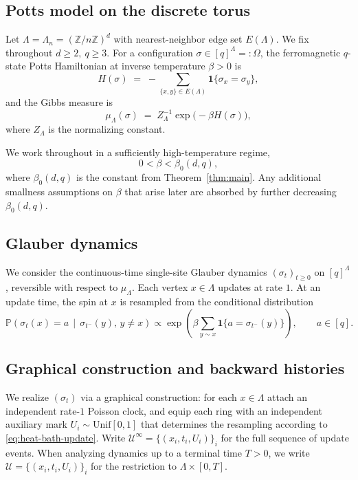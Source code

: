 \documentclass[letterpaper,11pt,reqno]{amsart}
\theoremstyle{definition}
\begin{document}
\subsection{Potts model on the discrete torus}
Let $\Lambda=\Lambda_n=(\mathbb{Z}/n\mathbb{Z})^d$ with nearest-neighbor edge set $E(\Lambda)$. We fix throughout $d\geq 2,\ q\geq 3$. For a configuration $\sigma\in[q]^\Lambda=:\Omega$, the ferromagnetic $q$-state Potts Hamiltonian at inverse temperature $\beta>0$ is
\[
H(\sigma) \;=\; - \sum_{\{x,y\}\in E(\Lambda)} \mathbf{1}\{\sigma_x=\sigma_y\},
\]
and the Gibbs measure is
\[
\mu_\Lambda(\sigma)
\;=\;
Z_\Lambda^{-1}\exp\big(-\beta H(\sigma)\big),
\]
where $Z_\Lambda$ is the normalizing constant.

We work throughout in a sufficiently high-temperature regime,
\begin{equation}\label{eq:high-temp-assumption}
0<\beta<\beta_0(d,q),
\end{equation}
where \(\beta_0(d,q)\) is the constant from Theorem~\ref{thm:main}. {Any additional smallness assumptions on \(\beta\) that arise later are absorbed by further decreasing \(\beta_0(d,q)\).}

\subsection{Glauber dynamics}
We consider the continuous-time single-site Glauber dynamics $(\sigma_t)_{t\ge0}$ on $[q]^\Lambda$, reversible with respect to $\mu_\Lambda$. Each vertex $x\in\Lambda$ updates at rate $1$.
At an update time, the spin at $x$ is resampled from the conditional distribution
\begin{equation}\label{eq:heat-bath-update}
\mathbb P\!\left(\sigma_t(x)=a \,\middle|\, \sigma_{t^-}(y),\, y\neq x\right)
\propto
\exp\!\left(
\beta\sum_{y\sim x}\mathbf 1\{a=\sigma_{t^-}(y)\}
\right),
\qquad a\in[q].
\end{equation}



\subsection{Graphical construction and backward histories}\label{subsec:graphical}

We realize $(\sigma_t)$ via a graphical construction: for each $x\in\Lambda$ attach an independent
rate-$1$ Poisson clock, and equip each ring with an independent auxiliary mark
$U_i\sim\mathrm{Unif}[0,1]$ that determines the resampling according to
\eqref{eq:heat-bath-update}. Write $\mathcal U^\infty=\{(x_i,t_i,U_i)\}_i$ for the full sequence
of update events. When analyzing dynamics up to a terminal time $T>0$, we write
$\mathcal U=\{(x_i,t_i,U_i)\}_i$ for the restriction to $\Lambda\times[0,T]$.
\end{document}
